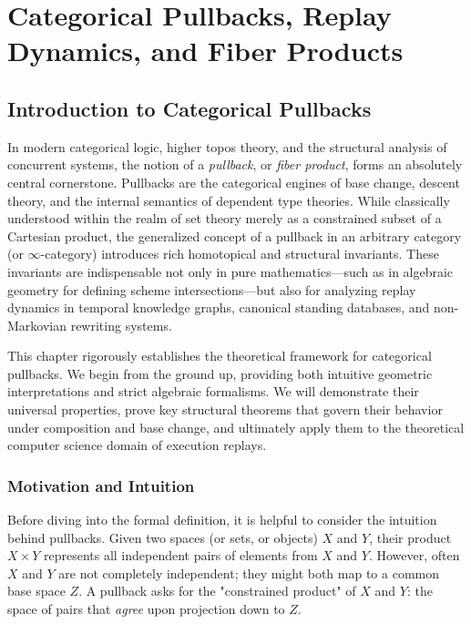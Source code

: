 \chapter{Categorical Pullbacks, Replay Dynamics, and Fiber Products}
\label{ch:pullbacks}

\section{Introduction to Categorical Pullbacks}

In modern categorical logic, higher topos theory, and the structural analysis of concurrent systems, the notion of a \emph{pullback}, or \emph{fiber product}, forms an absolutely central cornerstone. Pullbacks are the categorical engines of base change, descent theory, and the internal semantics of dependent type theories. While classically understood within the realm of set theory merely as a constrained subset of a Cartesian product, the generalized concept of a pullback in an arbitrary category (or $\infty$-category) introduces rich homotopical and structural invariants. These invariants are indispensable not only in pure mathematics—such as in algebraic geometry for defining scheme intersections—but also for analyzing replay dynamics in temporal knowledge graphs, canonical standing databases, and non-Markovian rewriting systems.

This chapter rigorously establishes the theoretical framework for categorical pullbacks. We begin from the ground up, providing both intuitive geometric interpretations and strict algebraic formalisms. We will demonstrate their universal properties, prove key structural theorems that govern their behavior under composition and base change, and ultimately apply them to the theoretical computer science domain of execution replays.

\subsection{Motivation and Intuition}
Before diving into the formal definition, it is helpful to consider the intuition behind pullbacks. Given two spaces (or sets, or objects) $X$ and $Y$, their product $X \times Y$ represents all independent pairs of elements from $X$ and $Y$. However, often $X$ and $Y$ are not completely independent; they might both map to a common base space $Z$. A pullback asks for the "constrained product" of $X$ and $Y$: the space of pairs that \emph{agree} upon projection down to $Z$. 

